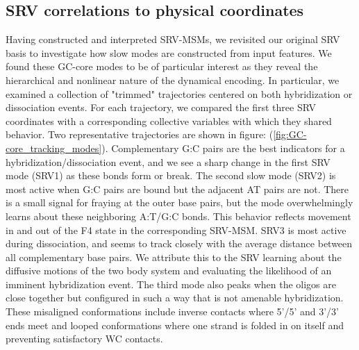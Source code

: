 \documentclass[journal=jpcbfk,manuscript=article]{achemso}
\begin{document}
\subsection{SRV correlations to physical coordinates}

Having constructed and interpreted SRV-MSMs, we revisited our original SRV basis to investigate how slow modes are constructed from input features. We found these GC-core modes to be of particular interest as they reveal the hierarchical and nonlinear nature of the dynamical encoding. In particular, we examined a collection of "trimmed" trajectories centered on both hybridization or dissociation events. For each trajectory, we compared the first three SRV coordinates with a corresponding collective variables with which they shared behavior. Two representative trajectories are shown in figure: (\ref{fig:GC-core_tracking_modes}). Complementary G:C pairs are the best indicators for a hybridization/dissociation event, and we see a sharp change in the first SRV mode (SRV1) as these bonds form or break. The second slow mode (SRV2) is most active when G:C pairs are bound but the adjacent AT pairs are not. There is a small signal for fraying at the outer base pairs, but the mode overwhelmingly learns about these neighboring A:T/G:C bonds. This behavior reflects movement in and out of the F4 state in the corresponding SRV-MSM. SRV3 is most active during dissociation, and seems to track closely with the average distance between all complementary base pairs. We attribute this to the SRV learning about the diffusive motions of the two body system and evaluating the likelihood of an imminent hybridization event. The third mode also peaks when the oligos are close together but configured in such a way that is not amenable hybridization. These misaligned conformations include inverse contacts where 5'/5' and 3'/3' ends meet and looped conformations where one strand is folded in on itself and preventing satisfactory WC contacts. 
\end{document}
